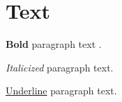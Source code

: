 



\chapter{Text} \label{text}

\textbf{Bold} paragraph text .

\textit{Italicized} paragraph text.

\underline{Underline} paragraph text.

